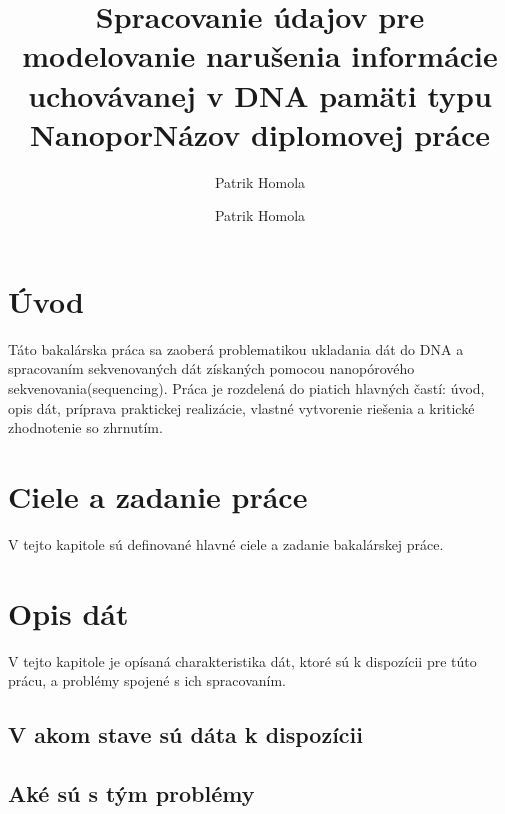 \documentclass[12pt]{article}
\title{Spracovanie údajov pre modelovanie narušenia informácie uchovávanej v DNA pamäti typu Nanopor}
\author{Patrik Homola}
\title{Názov diplomovej práce}
\author{Patrik Homola}
\begin{document}



%

%




\tableofcontents
\pagebreak
\listoffigures
\pagebreak

\glsaddall %
\printglossary[type=\acronymtype,title={Zoznam skratiek a značiek}]




\section{Úvod}
Táto bakalárska práca sa zaoberá problematikou ukladania dát do DNA a spracovaním sekvenovaných dát získaných pomocou nanopórového sekvenovania(sequencing). Práca je rozdelená do piatich hlavných častí: úvod, opis dát, príprava praktickej realizácie, vlastné vytvorenie riešenia a kritické zhodnotenie so zhrnutím.



\section{Ciele a zadanie práce}
V tejto kapitole sú definované hlavné ciele a zadanie bakalárskej práce.


\section{Opis dát}
V tejto kapitole je opísaná charakteristika dát, ktoré sú k dispozícii pre túto prácu, a problémy spojené s ich spracovaním.
\subsection{V akom stave sú dáta k dispozícii}


\subsection{Aké sú s tým problémy}


\end{document}
